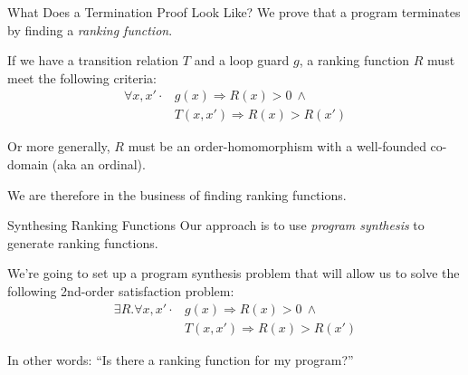 \documentclass[xcolor=pdftex,t,11pt]{beamer}
\begin{document}
\begin{frame}{What Does a Termination Proof Look Like?}
We prove that a program terminates by finding a \emph{ranking function}.

\vspace{1em}

If we have a transition relation $T$ and a loop guard $g$, a ranking function $R$
must meet the following criteria:
\begin{align}
 \forall x, x' \cdot & g(x) \Rightarrow R(x) > 0 ~ \wedge \\
                     & T(x, x') \Rightarrow R(x) > R(x')
\end{align}

Or more generally, $R$ must be an order-homomorphism with a well-founded co-domain (aka an ordinal).

\vspace{1em}

We are therefore in the business of finding ranking functions.
\end{frame}
% 
% 
% 
% 
% 
% 
% 


\begin{frame}{Synthesing Ranking Functions}
Our approach is to use \emph{program synthesis} to generate ranking functions.

\vspace{1em}

We're going to set up a program synthesis problem that will allow us to solve
the following 2nd-order satisfaction problem:
\begin{align*}
 \exists R . \forall x, x' \cdot & g(x) \Rightarrow R(x) > 0 ~ \wedge \\
                             & T(x, x') \Rightarrow R(x) > R(x')
\end{align*}

\pause

\vspace{1em}

In other words: ``Is there a ranking function for my program?''

\end{frame}
\end{document}
